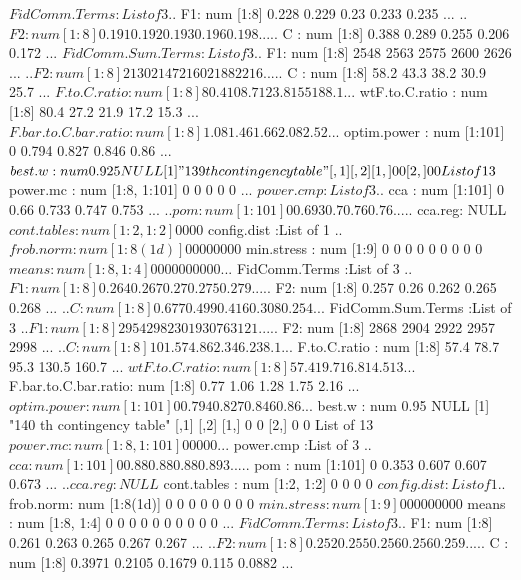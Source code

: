 \documentclass[11pt]{article} %
\begin{document}
\begin{Schunk}
\begin{Soutput}
 $ FidComm.Terms       :List of 3
  ..$ F1: num [1:8] 0.228 0.229 0.23 0.233 0.235 ...
  ..$ F2: num [1:8] 0.191 0.192 0.193 0.196 0.198 ...
  ..$ C : num [1:8] 0.388 0.289 0.255 0.206 0.172 ...
 $ FidComm.Sum.Terms   :List of 3
  ..$ F1: num [1:8] 2548 2563 2575 2600 2626 ...
  ..$ F2: num [1:8] 2130 2147 2160 2188 2216 ...
  ..$ C : num [1:8] 58.2 43.3 38.2 30.9 25.7 ...
 $ F.to.C.ratio        : num [1:8] 80.4 108.7 123.8 155 188.1 ...
 $ wtF.to.C.ratio      : num [1:8] 80.4 27.2 21.9 17.2 15.3 ...
 $ F.bar.to.C.bar.ratio: num [1:8] 1.08 1.46 1.66 2.08 2.52 ...
 $ optim.power         : num [1:101] 0 0.794 0.827 0.846 0.86 ...
 $ best.w              : num 0.925
NULL
[1] "139 th contingency table"
     [,1] [,2]
[1,]    0    0
[2,]    0    0
List of 13
 $ power.mc            : num [1:8, 1:101] 0 0 0 0 0 ...
 $ power.cmp           :List of 3
  ..$ cca    : num [1:101] 0 0.66 0.733 0.747 0.753 ...
  ..$ pom    : num [1:101] 0 0.693 0.7 0.76 0.76 ...
  ..$ cca.reg: NULL
 $ cont.tables         : num [1:2, 1:2] 0 0 0 0
 $ config.dist         :List of 1
  ..$ frob.norm: num [1:8(1d)] 0 0 0 0 0 0 0 0
 $ min.stress          : num [1:9] 0 0 0 0 0 0 0 0 0
 $ means               : num [1:8, 1:4] 0 0 0 0 0 0 0 0 0 0 ...
 $ FidComm.Terms       :List of 3
  ..$ F1: num [1:8] 0.264 0.267 0.27 0.275 0.279 ...
  ..$ F2: num [1:8] 0.257 0.26 0.262 0.265 0.268 ...
  ..$ C : num [1:8] 0.677 0.499 0.416 0.308 0.254 ...
 $ FidComm.Sum.Terms   :List of 3
  ..$ F1: num [1:8] 2954 2982 3019 3076 3121 ...
  ..$ F2: num [1:8] 2868 2904 2922 2957 2998 ...
  ..$ C : num [1:8] 101.5 74.8 62.3 46.2 38.1 ...
 $ F.to.C.ratio        : num [1:8] 57.4 78.7 95.3 130.5 160.7 ...
 $ wtF.to.C.ratio      : num [1:8] 57.4 19.7 16.8 14.5 13 ...
 $ F.bar.to.C.bar.ratio: num [1:8] 0.77 1.06 1.28 1.75 2.16 ...
 $ optim.power         : num [1:101] 0 0.794 0.827 0.846 0.86 ...
 $ best.w              : num 0.95
NULL
[1] "140 th contingency table"
     [,1] [,2]
[1,]    0    0
[2,]    0    0
List of 13
 $ power.mc            : num [1:8, 1:101] 0 0 0 0 0 ...
 $ power.cmp           :List of 3
  ..$ cca    : num [1:101] 0 0.88 0.88 0.88 0.893 ...
  ..$ pom    : num [1:101] 0 0.353 0.607 0.607 0.673 ...
  ..$ cca.reg: NULL
 $ cont.tables         : num [1:2, 1:2] 0 0 0 0
 $ config.dist         :List of 1
  ..$ frob.norm: num [1:8(1d)] 0 0 0 0 0 0 0 0
 $ min.stress          : num [1:9] 0 0 0 0 0 0 0 0 0
 $ means               : num [1:8, 1:4] 0 0 0 0 0 0 0 0 0 0 ...
 $ FidComm.Terms       :List of 3
  ..$ F1: num [1:8] 0.261 0.263 0.265 0.267 0.267 ...
  ..$ F2: num [1:8] 0.252 0.255 0.256 0.256 0.259 ...
  ..$ C : num [1:8] 0.3971 0.2105 0.1679 0.115 0.0882 ...

\end{Soutput}
\end{Schunk}
\end{document}
